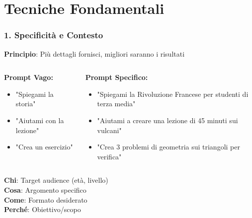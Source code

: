 \documentclass[aspectratio=169]{beamer}
\begin{document}
\section{Tecniche Fondamentali}
%
%
\begin{frame}
\frametitle{1. Specificità e Contesto}
\textbf{Principio}: Più dettagli fornisci, migliori saranno i risultati
\vspace{1cm}
\begin{columns}
\begin{column}{0.5\textwidth}
\textbf{Prompt Vago:}
\begin{itemize}
    \item "Spiegami la storia"
    \item "Aiutami con la lezione"
    \item "Crea un esercizio"
\end{itemize}
\end{column}
\begin{column}{0.5\textwidth}
\textbf{Prompt Specifico:}
\begin{itemize}
    \item "Spiegami la Rivoluzione Francese per studenti di terza media"
    \item "Aiutami a creare una lezione di 45 minuti sui vulcani"
    \item "Crea 3 problemi di geometria sui triangoli per verifica"
\end{itemize}
\end{column}
\end{columns}
\end{frame}
%
%
\begin{frame}
\vspace{1cm}
\large
\begin{tipbox}
\textbf{Chi}: Target audience (età, livello)\\
\textbf{Cosa}: Argomento specifico\\
\textbf{Come}: Formato desiderato\\
\textbf{Perché}: Obiettivo/scopo
\end{tipbox}
\end{frame}
%
%
\end{document}
